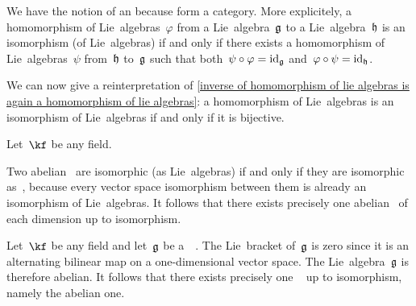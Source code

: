\begin{remark}
	We have the notion of an  because \liealgebras{$\kf$} form a category.
	More explicitely, a homomorphism of Lie~algebras~$\varphi$ from a Lie~algebra~$\mathfrak{g}$ to a Lie~algebra~$\mathfrak{h}$ is an isomorphism (of Lie~algebras) if and only if there exists a homomorphism of Lie~algebras~$\psi$ from~$\mathfrak{h}$ to~$\mathfrak{g}$ such that both~$\psi \circ \varphi = \mathrm{id}_{\mathfrak{g}}$ and~$\varphi \circ \psi = \mathrm{id}_{\mathfrak{h}}$.

	We can now give a reinterpretation of \cref{inverse of homomorphism of lie algebras is again a homomorphism of lie algebras}:
	a homomorphism of Lie~algebras is an isomorphism of Lie~algebras if and only if it is bijective.
\end{remark}


\begin{example}
	Let~$\kf$ be any field.

	Two abelian~{\liealgebras{$\kf$}} are isomorphic (as Lie~algebras) if and only if they are isomorphic as~{\vectorspaces{$\kf$}}, because every vector space isomorphism between them is already an isomorphism of Lie~algebras.
	It follows that there exists precisely one abelian~{\liealgebra{$\kf$}} of each dimension up to isomorphism.
\end{example}


\begin{example}
	Let~$\kf$ be any field and let~$\mathfrak{g}$ be a~{\onedimensional}~\liealgebra{$\kf$}.
	The Lie~bracket of~$\mathfrak{g}$ is zero since it is an alternating bilinear map on a one-dimensional vector space.
	The Lie~algebra~$\mathfrak{g}$ is therefore abelian.
	It follows that there exists precisely one {\onedimensional}~\liealgebra{$\kf$} up to isomorphism, namely the abelian one.
\end{example}


